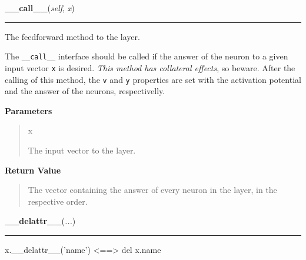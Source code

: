     \vspace{0.5ex}

    \begin{boxedminipage}{\textwidth}

    \raggedright \textbf{\_\_call\_\_}(\textit{self}, \textit{x})

    \vspace{-1.5ex}

    \rule{\textwidth}{0.5\fboxrule}

The feedforward method to the layer.

The \texttt{{\_}{\_}call{\_}{\_}} interface should be called if the answer of the neuron
to a given input vector \texttt{x} is desired. \emph{This method has collateral
effects}, so beware. After the calling of this method, the \texttt{v} and
\texttt{y} properties are set with the activation potential and the answer of
the neurons, respectivelly.
    \vspace{1ex}

      \textbf{Parameters}
      \begin{quote}
        \begin{Ventry}{x}

          \item[x]


The input vector to the layer.
        \end{Ventry}

      \end{quote}

    \vspace{1ex}

      \textbf{Return Value}
      \begin{quote}

The vector containing the answer of every neuron in the layer, in the
respective order.
      \end{quote}

    \vspace{1ex}

    \end{boxedminipage}

    \label{object:__delattr__}

    \vspace{0.5ex}

    \begin{boxedminipage}{\textwidth}

    \raggedright \textbf{\_\_delattr\_\_}(\textit{...})

    \vspace{-1.5ex}

    \rule{\textwidth}{0.5\fboxrule}

x.{\_}{\_}delattr{\_}{\_}('name') {\textless}=={\textgreater} del x.name
    \vspace{1ex}

    \end{boxedminipage}

